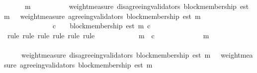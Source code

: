 \begin{isabellebody}
\ {\isachardoublequoteopen}{\isasymforall}\ {\isasymsigma}\ {\isasymin}\ {\isasymSigma}{\isachardot}\ {\isasymforall}\ m\ {\isasymin}\ {\isasymsigma}{\isachardot}\ {\isasymforall}\ {\isasymsigma}{\isacharprime}\ {\isasymin}\ {\isasymSigma}{\isachardot}\ {\isasymsigma}\ {\isasymsubseteq}\ {\isasymsigma}{\isacharprime}\ {\isasymlongrightarrow}\ weight{\isacharunderscore}measure\ {\isacharparenleft}disagreeing{\isacharunderscore}validators\ {\isacharparenleft}block{\isacharunderscore}membership\ {\isacharparenleft}est\ m{\isacharparenright}{\isacharcomma}\ {\isasymsigma}{\isacharprime}{\isacharparenright}{\isacharparenright}\ {\isacharless}\ weight{\isacharunderscore}measure\ {\isacharparenleft}agreeing{\isacharunderscore}validators\ {\isacharparenleft}block{\isacharunderscore}membership\ {\isacharparenleft}est\ m{\isacharparenright}{\isacharcomma}\ {\isasymsigma}{\isacharprime}{\isacharparenright}{\isacharparenright}\ \isanewline
\ \ \ \ \ \ \ \ \ \ \ \ {\isasymlongrightarrow}\ {\isacharparenleft}{\isasymforall}\ c\ {\isasymin}\ {\isasymepsilon}\ {\isasymsigma}{\isacharprime}{\isachardot}\ block{\isacharunderscore}membership\ {\isacharparenleft}est\ m{\isacharparenright}\ c{\isacharparenright}{\isachardoublequoteclose}\isanewline
\ \ \ \ \isamarkupfalse%
\ {\isacharparenleft}rule{\isacharcomma}\ rule{\isacharcomma}\ rule{\isacharcomma}\ rule{\isacharcomma}\ rule{\isacharcomma}\ rule{\isacharparenright}\isanewline
\ \ \isamarkupfalse%
\ {\isacharminus}\ \isanewline
\ \ \ \ \isamarkupfalse%
\ {\isasymsigma}\ m\ {\isasymsigma}{\isacharprime}\ c\isanewline
\ \ \ \ \isamarkupfalse%
\ {\isachardoublequoteopen}{\isasymsigma}\ {\isasymin}\ {\isasymSigma}{\isachardoublequoteclose}\isanewline
\ \ \ \ \ {\isachardoublequoteopen}m\ {\isasymin}\ {\isasymsigma}{\isachardoublequoteclose}\isanewline
\ \ \ \ \ {\isachardoublequoteopen}{\isasymsigma}{\isacharprime}\ {\isasymin}\ {\isasymSigma}{\isachardoublequoteclose}\isanewline
\ \ \ \ \ {\isachardoublequoteopen}{\isasymsigma}\ {\isasymsubseteq}\ {\isasymsigma}{\isacharprime}{\isachardoublequoteclose}\isanewline
\ \ \ \ \ {\isachardoublequoteopen}weight{\isacharunderscore}measure\ {\isacharparenleft}disagreeing{\isacharunderscore}validators\ {\isacharparenleft}block{\isacharunderscore}membership\ {\isacharparenleft}est\ m{\isacharparenright}{\isacharcomma}\ {\isasymsigma}{\isacharprime}{\isacharparenright}{\isacharparenright}\ {\isacharless}\ weight{\isacharunderscore}measure\ {\isacharparenleft}agreeing{\isacharunderscore}validators\ {\isacharparenleft}block{\isacharunderscore}membership\ {\isacharparenleft}est\ m{\isacharparenright}{\isacharcomma}\ {\isasymsigma}{\isacharprime}{\isacharparenright}{\isacharparenright}{\isachardoublequoteclose}\isanewline

\end{isabellebody}
